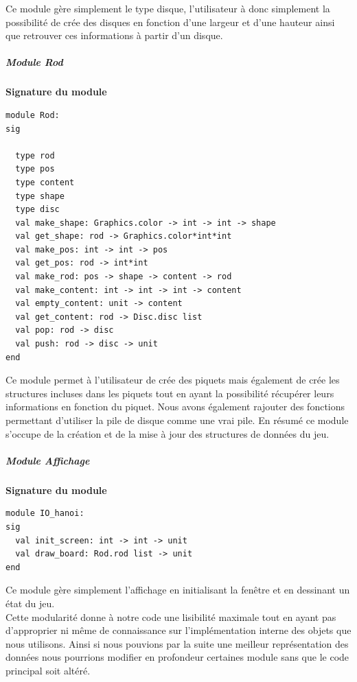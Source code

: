 \documentclass[a4paper,11pt]{article}
\begin{document}
Ce module gère simplement le type disque, l'utilisateur à donc simplement la possibilité de crée des disques en fonction d'une largeur et d'une hauteur ainsi que retrouver ces informations à partir d'un disque.

\subparagraph{Module Rod}
\begin{center}
\textbf{Signature du module}
\begin{lstlisting}
module Rod:
sig
  
  type rod
  type pos
  type content
  type shape
  type disc
  val make_shape: Graphics.color -> int -> int -> shape
  val get_shape: rod -> Graphics.color*int*int
  val make_pos: int -> int -> pos
  val get_pos: rod -> int*int
  val make_rod: pos -> shape -> content -> rod
  val make_content: int -> int -> int -> content
  val empty_content: unit -> content
  val get_content: rod -> Disc.disc list
  val pop: rod -> disc
  val push: rod -> disc -> unit    
end
\end{lstlisting}
\end{center}
Ce module permet à l'utilisateur de crée des piquets mais également de crée les structures incluses dans les piquets tout en ayant la possibilité récupérer leurs informations en fonction du piquet.
Nous avons également rajouter des fonctions permettant d'utiliser la pile de disque comme une vrai pile.
En résumé ce module s'occupe de la création et de la mise à jour des structures de données du jeu.

\subparagraph{Module Affichage}
\begin{center}
\textbf{Signature du module}
\begin{lstlisting}
module IO_hanoi:
sig
  val init_screen: int -> int -> unit
  val draw_board: Rod.rod list -> unit
end
\end{lstlisting}
\end{center}
Ce module gère simplement l'affichage en initialisant la fenêtre et en dessinant un état du jeu.
\\
Cette modularité donne à notre code une lisibilité maximale tout en ayant pas d'approprier ni même de connaissance sur l'implémentation interne des objets que nous utilisons.
Ainsi si nous pouvions par la suite une meilleur représentation des données nous pourrions modifier en profondeur certaines module sans que le code principal soit altéré.
\end{document}
